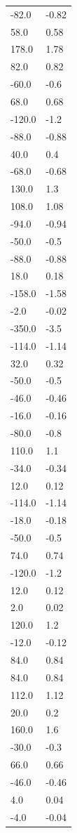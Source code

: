 \begin{longtable}{ll}
-82.0 & -0.82 \\
58.0 & 0.58 \\
178.0 & 1.78 \\
82.0 & 0.82 \\
-60.0 & -0.6 \\
68.0 & 0.68 \\
-120.0 & -1.2 \\
-88.0 & -0.88 \\
40.0 & 0.4 \\
-68.0 & -0.68 \\
130.0 & 1.3 \\
108.0 & 1.08 \\
-94.0 & -0.94 \\
-50.0 & -0.5 \\
-88.0 & -0.88 \\
18.0 & 0.18 \\
-158.0 & -1.58 \\
-2.0 & -0.02 \\
-350.0 & -3.5 \\
-114.0 & -1.14 \\
32.0 & 0.32 \\
-50.0 & -0.5 \\
-46.0 & -0.46 \\
-16.0 & -0.16 \\
-80.0 & -0.8 \\
110.0 & 1.1 \\
-34.0 & -0.34 \\
12.0 & 0.12 \\
-114.0 & -1.14 \\
-18.0 & -0.18 \\
-50.0 & -0.5 \\
74.0 & 0.74 \\
-120.0 & -1.2 \\
12.0 & 0.12 \\
2.0 & 0.02 \\
120.0 & 1.2 \\
-12.0 & -0.12 \\
84.0 & 0.84 \\
84.0 & 0.84 \\
112.0 & 1.12 \\
20.0 & 0.2 \\
160.0 & 1.6 \\
-30.0 & -0.3 \\
66.0 & 0.66 \\
-46.0 & -0.46 \\
4.0 & 0.04 \\
-4.0 & -0.04 \\

\end{longtable}
